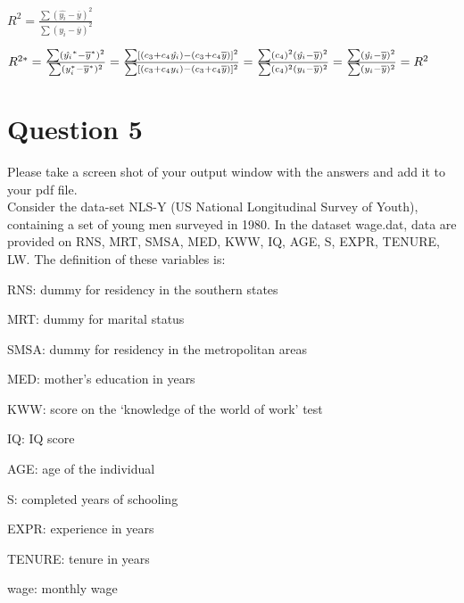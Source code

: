 \documentclass[12pt]{article}%
\begin{document}
\begin{enumerate}
    $R^2 = \frac{\sum(\hat{y_i}-\overline{y})^2}{\sum(y_i-\overline{y})^2}$
    
    $R^{2*} = \frac{\sum(\hat{y_i}^*-\overline{y}^*)^2}{\sum(y_i^*-\overline{y}^*)^2}\\
    = \frac{\sum[(c_3+c_4\hat{y_i})-(c_3+c_4\overline{y})]^2}{\sum[(c_3+c_4y_i)-(c_3+c_4\overline{y})]^2}\\
    = \frac{\sum (c_4)^2 (\hat{y_i}-\overline{y})^2}{\sum (c_4)^2 (y_i-\overline{y})^2}\\
    = \frac{\sum(\hat{y_i}-\overline{y})^2}{\sum (y_i-\overline{y})^2}\\
    = R^2$
    
\end{enumerate}

\pagebreak
\section{Question 5}

Please take a screen shot of your output window with the answers and add it to your pdf file. \\
Consider the data-set NLS-Y (US National Longitudinal Survey of Youth), containing a set of young men surveyed in 1980. In the dataset wage.dat, data are provided on RNS, MRT, SMSA, MED, KWW, IQ, AGE, S, EXPR, TENURE, LW. The definition of these variables is:

RNS: dummy for residency in the southern states

MRT: dummy for marital status

SMSA: dummy for residency in the metropolitan areas

MED: mother's education in years

KWW: score on the `knowledge of the world of work' test

IQ: IQ score

AGE: age of the individual

S: completed years of schooling

EXPR: experience in years

TENURE: tenure in years

wage: monthly wage
\end{document}
